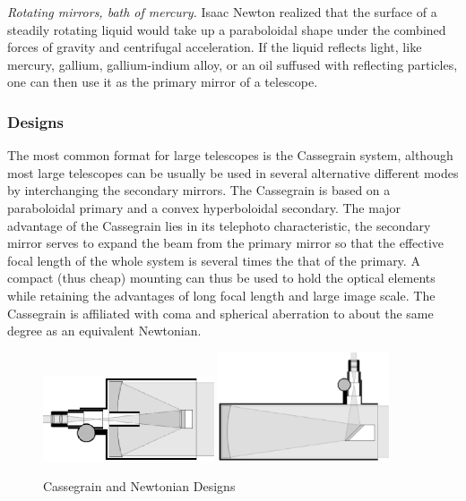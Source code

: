 \noindent
{\it Rotating mirrors, bath of mercury.} Isaac Newton realized that the surface of a steadily rotating liquid would take up a paraboloidal shape under the combined forces of gravity and
centrifugal acceleration. If the liquid reflects light, like mercury, gallium, gallium-indium alloy, or an oil suffused with reflecting particles, one can then use it as the primary mirror of a telescope. 

\subsubsection{Designs}

The most common format for large telescopes is the Cassegrain system, although
most large telescopes can be usually be used in several alternative 
different modes by interchanging the secondary mirrors. The Cassegrain is
based on a paraboloidal primary and a convex hyperboloidal secondary. The 
major advantage of the Cassegrain lies in its telephoto characteristic, 
the secondary mirror serves to expand the beam from the primary mirror so 
that the effective focal length of the whole system is several times the
that of the primary. A compact (thus cheap) mounting can thus be used to 
hold the optical elements while retaining the advantages of long focal length
and large image scale. The Cassegrain is affiliated with coma and spherical
aberration to about the same degree as an equivalent Newtonian.

\begin{figure}[th!]
	\centering
	\includegraphics[width=0.45\textwidth]{cassegraindetailed.eps}
	\includegraphics[width=0.45\textwidth]{newtoniandetailed.eps}
  \caption{Cassegrain and Newtonian Designs}
  \label{fig:catatropic}
\end{figure}

